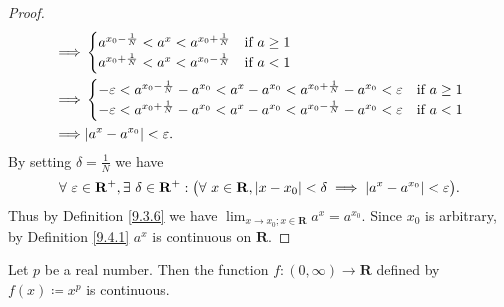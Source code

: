 \begin{proof}
\begin{align*}
        \implies & \begin{cases}
            a^{x_0 - \frac{1}{N}} < a^{x} < a^{x_0 + \frac{1}{N}} & \text{if } a \geq 1 \\
            a^{x_0 + \frac{1}{N}} < a^{x} < a^{x_0 - \frac{1}{N}} & \text{if } a < 1
        \end{cases}                              \\
        \implies & \begin{cases}
            -\varepsilon < a^{x_0 - \frac{1}{N}} - a^{x_0} < a^x - a^{x_0} < a^{x_0 + \frac{1}{N}} - a^{x_0} < \varepsilon & \text{if } a \geq 1 \\
            -\varepsilon < a^{x_0 + \frac{1}{N}} - a^{x_0} < a^x - a^{x_0} < a^{x_0 - \frac{1}{N}} - a^{x_0} < \varepsilon & \text{if } a < 1
        \end{cases}                              \\
        \implies & \abs*{a^x - a^{x_0}} < \varepsilon.
    \end{align*}
    By setting \(\delta = \frac{1}{N}\) we have
    \[
        \forall\ \varepsilon \in \mathbf{R}^+, \exists\ \delta \in \mathbf{R}^+ : \big(\forall\ x \in \mathbf{R}, \abs*{x - x_0} < \delta \implies \abs*{a^x - a^{x_0}} < \varepsilon\big).
    \]
    Thus by Definition \ref{9.3.6} we have \(\lim_{x \to x_0 ; x \in \mathbf{R}} a^x = a^{x_0}\).
    Since \(x_0\) is arbitrary, by Definition \ref{9.4.1} \(a^x\) is continuous on \(\mathbf{R}\).
\end{proof}

\begin{proposition}\label{9.4.11}
    Let \(p\) be a real number.
    Then the function \(f : (0, \infty) \to \mathbf{R}\) defined by \(f(x) \coloneqq x^p\) is continuous.
\end{proposition}

